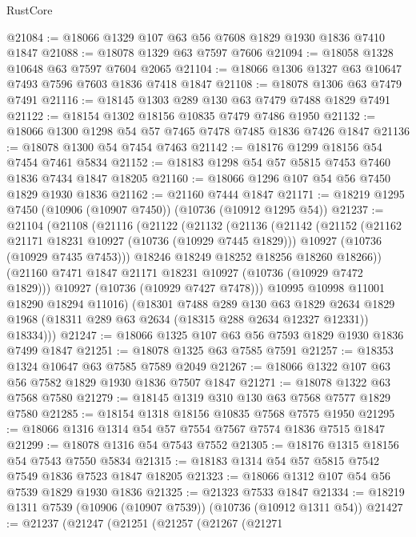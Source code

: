 \begin{lexlean}{RustCore}
\begin{coremodule}
@21084 := @18066 @1329 @107 @63 @56 @7608 @1829 @1930 @1836 @7410 @1847
@21088 := @18078 @1329 @63 @7597 @7606
@21094 := @18058 @1328 @10648 @63 @7597 @7604 @2065
@21104 := @18066 @1306 @1327 @63 @10647 @7493 @7596 @7603 @1836 @7418 @1847
@21108 := @18078 @1306 @63 @7479 @7491
@21116 := @18145 @1303 @289 @130 @63 @7479 @7488 @1829 @7491
@21122 := @18154 @1302 @18156 @10835 @7479 @7486 @1950
@21132 := @18066 @1300 @1298 @54 @57 @7465 @7478 @7485 @1836 @7426 @1847
@21136 := @18078 @1300 @54 @7454 @7463
@21142 := @18176 @1299 @18156 @54 @7454 @7461 @5834
@21152 := @18183 @1298 @54 @57 @5815 @7453 @7460 @1836 @7434 @1847 @18205
@21160 := @18066 @1296 @107 @54 @56 @7450 @1829 @1930 @1836
@21162 := @21160 @7444 @1847
@21171 := @18219 @1295 @7450 (@10906 (@10907 @7450)) (@10736 (@10912 @1295 @54))
@21237 := @21104
    (@21108
      (@21116
        (@21122
          (@21132
            (@21136
              (@21142
                (@21152
                  (@21162 @21171 @18231 @10927 (@10736 (@10929 @7445 @1829)))
                  @10927
                  (@10736 (@10929 @7435 @7453)))
                @18246
                @18249
                @18252
                @18256
                @18260
                @18266))
            (@21160 @7471 @1847 @21171 @18231 @10927 (@10736 (@10929 @7472 @1829)))
            @10927
            (@10736 (@10929 @7427 @7478)))
          @10995
          @10998
          @11001
          @18290
          @18294
          @11016)
        (@18301
          @7488
          @289
          @130
          @63
          @1829
          @2634
          @1829
          @1968
          (@18311 @289 @63 @2634 (@18315 @288 @2634 @12327 @12331))
          @18334)))
@21247 := @18066 @1325 @107 @63 @56 @7593 @1829 @1930 @1836 @7499 @1847
@21251 := @18078 @1325 @63 @7585 @7591
@21257 := @18353 @1324 @10647 @63 @7585 @7589 @2049
@21267 := @18066 @1322 @107 @63 @56 @7582 @1829 @1930 @1836 @7507 @1847
@21271 := @18078 @1322 @63 @7568 @7580
@21279 := @18145 @1319 @310 @130 @63 @7568 @7577 @1829 @7580
@21285 := @18154 @1318 @18156 @10835 @7568 @7575 @1950
@21295 := @18066 @1316 @1314 @54 @57 @7554 @7567 @7574 @1836 @7515 @1847
@21299 := @18078 @1316 @54 @7543 @7552
@21305 := @18176 @1315 @18156 @54 @7543 @7550 @5834
@21315 := @18183 @1314 @54 @57 @5815 @7542 @7549 @1836 @7523 @1847 @18205
@21323 := @18066 @1312 @107 @54 @56 @7539 @1829 @1930 @1836
@21325 := @21323 @7533 @1847
@21334 := @18219 @1311 @7539 (@10906 (@10907 @7539)) (@10736 (@10912 @1311 @54))
@21427 := @21237
    (@21247
      (@21251
        (@21257
          (@21267
            (@21271

\end{coremodule}
\end{lexlean}
